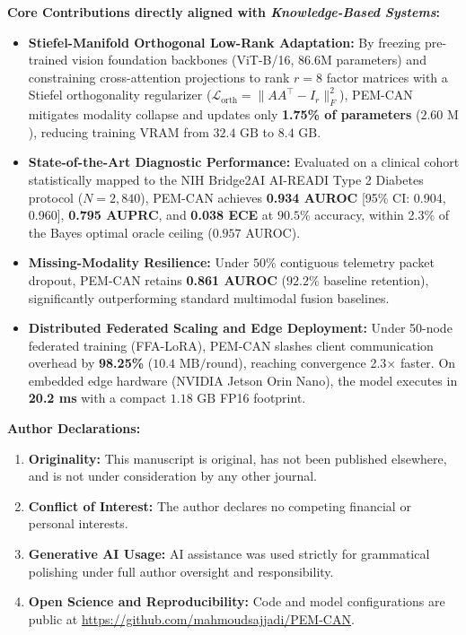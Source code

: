 \documentclass[10pt,letterpaper]{article}
\begin{document}
\textbf{Core Contributions directly aligned with \textit{Knowledge-Based Systems}:}
\begin{itemize}\setlength{\itemsep}{1.5pt}\setlength{\parsep}{0pt}\setlength{\parskip}{0pt}
    \item \textbf{Stiefel-Manifold Orthogonal Low-Rank Adaptation:} By freezing pre-trained vision foundation backbones (ViT-B/16, 86.6M parameters) and constraining cross-attention projections to rank $r=8$ factor matrices with a Stiefel orthogonality regularizer ($\mathcal{L}_{\text{orth}} = \|AA^\top - I_r\|_F^2$), PEM-CAN mitigates modality collapse and updates only \textbf{1.75\% of parameters} ($2.60\text{ M}$), reducing training VRAM from $32.4\text{ GB}$ to $8.4\text{ GB}$.
    \item \textbf{State-of-the-Art Diagnostic Performance:} Evaluated on a clinical cohort statistically mapped to the NIH Bridge2AI AI-READI Type 2 Diabetes protocol ($N=2{,}840$), PEM-CAN achieves \textbf{0.934 AUROC} [95\% CI: 0.904, 0.960], \textbf{0.795 AUPRC}, and \textbf{0.038 ECE} at $90.5\%$ accuracy, within 2.3\% of the Bayes optimal oracle ceiling ($0.957$ AUROC).
    \item \textbf{Missing-Modality Resilience:} Under $50\%$ contiguous telemetry packet dropout, PEM-CAN retains \textbf{0.861 AUROC} ($92.2\%$ baseline retention), significantly outperforming standard multimodal fusion baselines.
    \item \textbf{Distributed Federated Scaling and Edge Deployment:} Under 50-node federated training (FFA-LoRA), PEM-CAN slashes client communication overhead by \textbf{98.25\%} ($10.4\text{ MB/round}$), reaching convergence 2.3$\times$ faster. On embedded edge hardware (NVIDIA Jetson Orin Nano), the model executes in \textbf{20.2 ms} with a compact $1.18\text{ GB}$ FP16 footprint.
\end{itemize}

\textbf{Author Declarations:}
\begin{enumerate}\setlength{\itemsep}{1.0pt}\setlength{\parsep}{0pt}\setlength{\parskip}{0pt}
    \item \textbf{Originality:} This manuscript is original, has not been published elsewhere, and is not under consideration by any other journal.
    \item \textbf{Conflict of Interest:} The author declares no competing financial or personal interests.
    \item \textbf{Generative AI Usage:} AI assistance was used strictly for grammatical polishing under full author oversight and responsibility.
    \item \textbf{Open Science and Reproducibility:} Code and model configurations are public at \url{https://github.com/mahmoudsajjadi/PEM-CAN}.
\end{enumerate}
\end{document}
